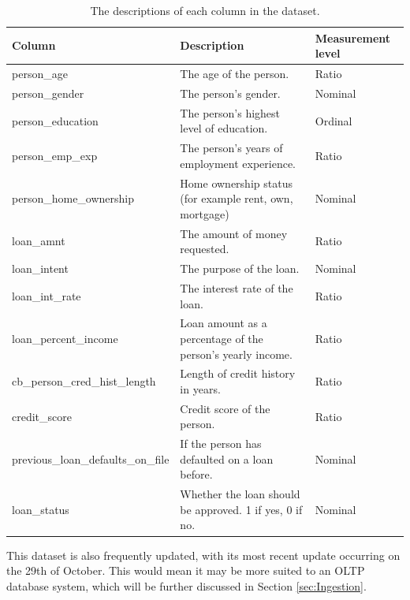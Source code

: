 \documentclass[12pt]{report}
\begin{document}
\begin{table}[H]
    \centering
    \begin{tabular}{|p{}| p{}| p{} |}
        \hline
        \cellcolor{blue!25}Column & \cellcolor{blue!25}Description & \cellcolor{blue!25}Measurement level\\
            \hline
            person\_age & The age of the person. & Ratio\\
            \hline
            person\_gender & The person's gender. & Nominal\\
            \hline
            person\_education & The person's highest level of education. & Ordinal\\
            \hline
            person\_emp\_exp & The person's years of employment experience. & Ratio\\
            \hline
            person\_home\_ownership & Home ownership status (for example rent, own, mortgage)
            & Nominal\\
            \hline
            loan\_amnt & The amount of money requested. & Ratio\\
            \hline
            loan\_intent & The purpose of the loan. & Nominal\\
            \hline
            loan\_int\_rate & The interest rate of the loan. & Ratio\\
            \hline
            loan\_percent\_income & Loan amount as a percentage of the person's yearly income.
            & Ratio\\
            \hline
            cb\_person\_cred\_hist\_length & Length of credit history in years. & Ratio\\
            \hline
            credit\_score & Credit score of the person. & Ratio\\
            \hline
            previous\_loan\_defaults\_on\_file & If the person has defaulted on a loan before.
            & Nominal \\
            \hline
            loan\_status & Whether the loan should be approved. 1 if yes, 0 if no.
            & Nominal\\
            \hline
    \end{tabular}
    \caption{The descriptions of each column in the dataset.}\label{tab:Loan-Types}
\end{table}

This dataset is also frequently updated, with its most recent update occurring on the 29th of October.
This would mean it may be more suited to an OLTP database system, which will be further discussed in Section 
\ref{sec:Ingestion}.
\end{document}
